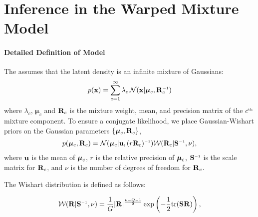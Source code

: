









\chapter{Inference in the Warped Mixture Model}
\label{ch:warped-appendix}

\subsubsection{Detailed Definition of Model}

The \iwmm{} assumes that the latent density is an infinite mixture of Gaussians:
\begin{align}
p(\vx ) = \sum_{c=1}^{\infty} \lambda_c \, {\cal N}(\vx|\bm{\mu}_{c},\vR_{c}\inv)
\end{align}
where $\lambda_{c}$, $\bm{\mu}_{c}$ and $\mathbf{R}_{c}$ is the mixture weight, mean, and precision matrix of the $c^{\text{\tiny th}}$ mixture component.
%
To ensure a conjugate likelihood, we place Gaussian-Wishart priors on the Gaussian parameters
$\{\bm{\mu}_{c},\mathbf{R}_{c}\}$,
\begin{align}
p(\bm{\mu}_{c},\vR_{c})
= {\cal N}(\bm{\mu}_{c}|\vu,(r\vR_{c})\inv)
{\cal W}(\vR_{c}|\vS\inv,\nu),
\end{align}
%
where ${\bf{u}}$ is the mean of ${\boldsymbol{\mu}}_c$, $r$ is the relative precision of ${\boldsymbol{\mu}}_{c}$, $\vS\inv$ is the scale matrix for $\mathbf{R}_c$, and $\nu$ is the number of degrees of freedom for $\mathbf{R}_c$.

The Wishart distribution is defined as follows:

\begin{align}
{\cal W}(\vR|\vS\inv,\nu)=\frac{1}{G}|\vR|^{\frac{\nu-Q-1}{2}}\exp\left(-\frac{1}{2}{\rm tr}(\vS\vR)\right),
\end{align}

